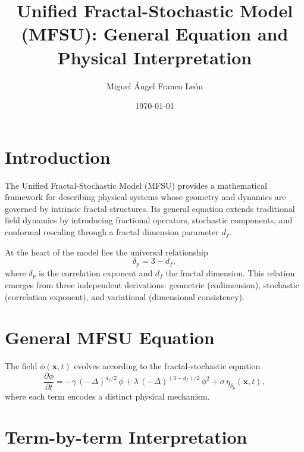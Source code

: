 \documentclass[11pt,a4paper]{article}
\title{\textbf{Unified Fractal-Stochastic Model (MFSU): General Equation and Physical Interpretation}}
\author{Miguel Ángel Franco León}
\date{\today}
\begin{document}
\maketitle

\section*{Introduction}

The Unified Fractal-Stochastic Model (MFSU) provides a mathematical framework for describing physical systems whose geometry and dynamics are governed by intrinsic fractal structures. Its general equation extends traditional field dynamics by introducing fractional operators, stochastic components, and conformal rescaling through a fractal dimension parameter $d_f$. 

At the heart of the model lies the universal relationship
\[
\delta_p = 3 - d_f,
\]
where $\delta_p$ is the correlation exponent and $d_f$ the fractal dimension. This relation emerges from three independent derivations: geometric (codimension), stochastic (correlation exponent), and variational (dimensional consistency).

\section*{General MFSU Equation}

The field $\phi(\mathbf{x},t)$ evolves according to the fractal-stochastic equation
\begin{equation}
\frac{\partial \phi}{\partial t}
= - \gamma \, (-\Delta)^{d_f/2}\,\phi
+ \lambda \, (-\Delta)^{(3-d_f)/2}\,\phi^2
+ \sigma \, \eta_{\delta_p}(\mathbf{x},t),
\label{eq:MFSU}
\end{equation}
where each term encodes a distinct physical mechanism.

\section*{Term-by-term Interpretation}
\end{document}
